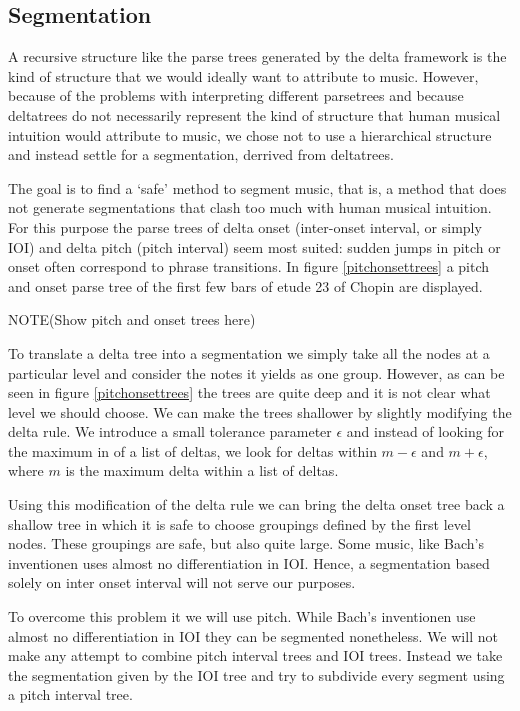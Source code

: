 \documentclass[a4paper,10pt]{article}
\begin{document}
\subsection{Segmentation}
\label{segmentation}

A recursive structure like the parse trees generated by the delta framework is the kind of structure that we would ideally want to attribute to music. However, because of the problems with interpreting different parsetrees and because deltatrees do not necessarily represent the kind of structure that human musical intuition would attribute to music, we chose not to use a hierarchical structure and instead settle for a segmentation, derrived from deltatrees.

The goal is to find a `safe' method to segment music, that is, a method that does not generate segmentations that clash too much with human musical intuition. For this purpose the parse trees of delta onset (inter-onset interval, or simply IOI) and delta pitch (pitch interval) seem most suited: sudden jumps in pitch or onset often correspond to phrase transitions. In figure \ref{pitchonsettrees} a pitch and onset parse tree of the first few bars of etude 23 of Chopin are displayed. 

NOTE(Show pitch and onset trees here) 

To translate a delta tree into a segmentation we simply take all the nodes at a particular level and consider the notes it yields as one group. However, as can be seen in figure \ref{pitchonsettrees} the trees are quite deep and it is not clear what level we should choose. We can make the trees shallower by slightly modifying the delta rule. We introduce a small tolerance parameter $\epsilon$ and instead of looking for the maximum in of a list of deltas, we look for deltas within $m - \epsilon$ and $m + \epsilon$, where $m$ is the maximum delta within a list of deltas.

Using this modification of the delta rule we can bring the delta onset tree back a shallow tree in which it is safe to choose groupings defined by the first level nodes. These groupings are safe, but also quite large. Some music, like Bach's inventionen uses almost no differentiation in IOI. Hence, a segmentation based solely on inter onset interval will not serve our purposes.

To overcome this problem it we will use pitch. While Bach's inventionen use almost no differentiation in IOI they can be segmented nonetheless. We will not make any attempt to combine pitch interval trees and IOI trees. Instead we take the segmentation given by the IOI tree and try to subdivide every segment using a pitch interval tree. 
\end{document}
